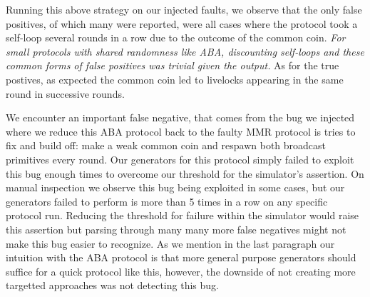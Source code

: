 
Running this above strategy on our injected faults, we observe that the only false positives, of which many were reported, were all cases where the protocol took a self-loop several rounds in a row due to the outcome of the common coin.
\emph{For small protocols with shared randomness like ABA, discounting self-loops and these common forms of false positives was trivial given the output.}
As for the true postives, as expected the common coin led to livelocks appearing in the same round in successive rounds.  

We encounter an important false negative, that comes from the bug we injected where we reduce this ABA protocol back to the faulty MMR protocol is tries to fix and build off: make a weak common coin and respawn both broadcast primitives every round.
Our generators for this protocol simply failed to exploit this bug enough times to overcome our threshold for the simulator's assertion.
On manual inspection we observe this bug being exploited in some cases, but our generators failed to perform is more than 5 times in a row on any specific protocol run.
Reducing the threshold for failure within the simulator would raise this assertion but parsing through many many more false negatives might not make this bug easier to recognize.
As we mention in the last paragraph our intuition with the ABA protocol is that more general purpose generators should suffice for a quick protocol like this, however, the downside of not creating more targetted approaches was not detecting this bug.


